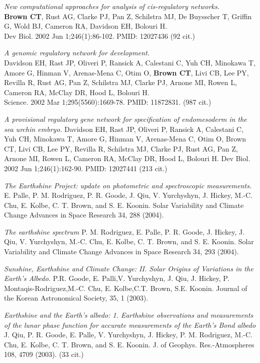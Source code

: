 \documentclass[margin,line]{resume}
\begin{document}
\begin{resume}
  {\em New
computational approaches for analysis of {\em cis}-regulatory networks.}  \\
{\bf Brown CT}, Rust AG, Clarke PJ, Pan Z, Schilstra MJ, De Buysscher
T, Griffin G, Wold BJ, Cameron RA, Davidson EH, Bolouri H.\\
Dev Biol. 2002 Jun 1;246(1):86-102.  PMID: 12027436 (92 cit.)

{\em A genomic
regulatory network for development.}\\
Davidson EH, Rast JP, Oliveri P, Ransick A, Calestani C, Yuh CH,
Minokawa T, Amore G, Hinman V, Arenas-Mena C, Otim O, {\bf Brown CT}, Livi
CB, Lee PY, Revilla R, Rust AG, Pan Z, Schilstra MJ, Clarke PJ, Arnone
MI, Rowen L, Cameron RA, McClay DR, Hood L, Bolouri H.
\\Science. 2002 Mar
1;295(5560):1669-78.  PMID: 11872831. (987 cit.)

{\em A provisional regulatory gene network for specification of endomesoderm in the sea urchin embryo.}
Davidson EH, Rast JP, Oliveri P, Ransick A, Calestani C, Yuh CH, Minokawa T, Amore G, Hinman V, Arenas-Mena C, Otim O, Brown CT, Livi CB, Lee PY, Revilla R, Schilstra MJ, Clarke PJ, Rust AG, Pan Z, Arnone MI, Rowen L, Cameron RA, McClay DR, Hood L, Bolouri H.
Dev Biol. 2002 Jun 1;246(1):162-90.
PMID: 12027441 (213 cit.)

{\em The Earthshine Project: update on photometric and spectroscopic measurements.}
 E. Palle, P. M. Rodriguez, P. R. Goode, J. Qiu, V. Yurchyshyn, J. Hickey, M.-C. Chu, E. Kolbe, C. T. Brown, and S. E. Koonin.
Solar Variability and Climate Change Advances in Space Research 34, 288 (2004).

{\em The earthshine spectrum}
P. M. Rodriguez, E. Palle, P. R. Goode, J. Hickey, J. Qiu, V. Yurchyshyn, M.-C. Chu, E. Kolbe, C. T. Brown, and S. E. Koonin.
Solar Variability and Climate Change Advances in Space Research 34, 293 (2004).

{\em Sunshine, Earthshine and Climate Change: II. Solar Origins of Variations in the Earth's Albedo.}  P.R. Goode, E. Palli,V. Yurchyshyn, J. Qiu,
 J. Hickey, P. Montaqis-Rodriguez,M.-C. Chu,
 E. Kolbe,C.T. Brown, S.E. Koonin.
Journal of the Korean Astronomical Society, 35, 1 (2003).

{\em Earthshine and the Earth's albedo: 1. Earthshine observations and measurements of the lunar phase function for accurate measurements of the Earth's Bond albedo}
J. Qiu, P. R. Goode, E. Palle, V. Yurchyshyn, J. Hickey, P. M. Rodriguez, M.-C. Chu, E. Kolbe, C. T. Brown, and S. E. Koonin.
J. of Geophys. Res.-Atmospheres 108, 4709 (2003).  (33 cit.)


\end{resume}
\end{document}
